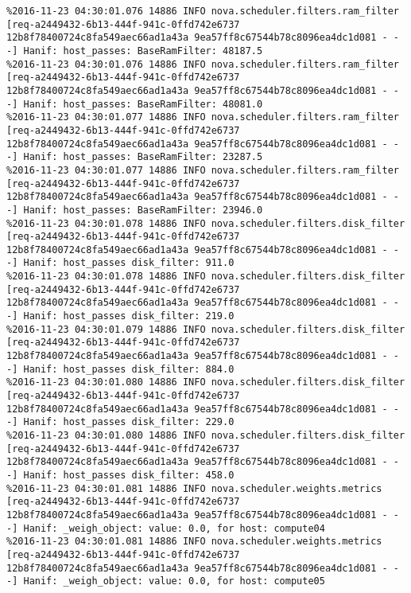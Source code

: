 \begin{lstlisting}[frame=single, caption={The filter scheduler log trace for 10 virtual instances}, label={lst:filterschedulercodetracelog10vi}, escapechar=|]
%2016-11-23 04:30:01.075 14886 INFO nova.scheduler.filters.ram_filter [req-a2449432-6b13-444f-941c-0ffd742e6737 12b8f78400724c8fa549aec66ad1a43a 9ea57ff8c67544b78c8096ea4dc1d081 - - -] Hanif: host_passes: BaseRamFilter: 11598.0
%2016-11-23 04:30:01.076 14886 INFO nova.scheduler.filters.ram_filter [req-a2449432-6b13-444f-941c-0ffd742e6737 12b8f78400724c8fa549aec66ad1a43a 9ea57ff8c67544b78c8096ea4dc1d081 - - -] Hanif: host_passes: BaseRamFilter: 48187.5
%2016-11-23 04:30:01.076 14886 INFO nova.scheduler.filters.ram_filter [req-a2449432-6b13-444f-941c-0ffd742e6737 12b8f78400724c8fa549aec66ad1a43a 9ea57ff8c67544b78c8096ea4dc1d081 - - -] Hanif: host_passes: BaseRamFilter: 48081.0
%2016-11-23 04:30:01.077 14886 INFO nova.scheduler.filters.ram_filter [req-a2449432-6b13-444f-941c-0ffd742e6737 12b8f78400724c8fa549aec66ad1a43a 9ea57ff8c67544b78c8096ea4dc1d081 - - -] Hanif: host_passes: BaseRamFilter: 23287.5
%2016-11-23 04:30:01.077 14886 INFO nova.scheduler.filters.ram_filter [req-a2449432-6b13-444f-941c-0ffd742e6737 12b8f78400724c8fa549aec66ad1a43a 9ea57ff8c67544b78c8096ea4dc1d081 - - -] Hanif: host_passes: BaseRamFilter: 23946.0
%2016-11-23 04:30:01.078 14886 INFO nova.scheduler.filters.disk_filter [req-a2449432-6b13-444f-941c-0ffd742e6737 12b8f78400724c8fa549aec66ad1a43a 9ea57ff8c67544b78c8096ea4dc1d081 - - -] Hanif: host_passes disk_filter: 911.0
%2016-11-23 04:30:01.078 14886 INFO nova.scheduler.filters.disk_filter [req-a2449432-6b13-444f-941c-0ffd742e6737 12b8f78400724c8fa549aec66ad1a43a 9ea57ff8c67544b78c8096ea4dc1d081 - - -] Hanif: host_passes disk_filter: 219.0
%2016-11-23 04:30:01.079 14886 INFO nova.scheduler.filters.disk_filter [req-a2449432-6b13-444f-941c-0ffd742e6737 12b8f78400724c8fa549aec66ad1a43a 9ea57ff8c67544b78c8096ea4dc1d081 - - -] Hanif: host_passes disk_filter: 884.0
%2016-11-23 04:30:01.080 14886 INFO nova.scheduler.filters.disk_filter [req-a2449432-6b13-444f-941c-0ffd742e6737 12b8f78400724c8fa549aec66ad1a43a 9ea57ff8c67544b78c8096ea4dc1d081 - - -] Hanif: host_passes disk_filter: 229.0
%2016-11-23 04:30:01.080 14886 INFO nova.scheduler.filters.disk_filter [req-a2449432-6b13-444f-941c-0ffd742e6737 12b8f78400724c8fa549aec66ad1a43a 9ea57ff8c67544b78c8096ea4dc1d081 - - -] Hanif: host_passes disk_filter: 458.0
%2016-11-23 04:30:01.081 14886 INFO nova.scheduler.weights.metrics [req-a2449432-6b13-444f-941c-0ffd742e6737 12b8f78400724c8fa549aec66ad1a43a 9ea57ff8c67544b78c8096ea4dc1d081 - - -] Hanif: _weigh_object: value: 0.0, for host: compute04
%2016-11-23 04:30:01.081 14886 INFO nova.scheduler.weights.metrics [req-a2449432-6b13-444f-941c-0ffd742e6737 12b8f78400724c8fa549aec66ad1a43a 9ea57ff8c67544b78c8096ea4dc1d081 - - -] Hanif: _weigh_object: value: 0.0, for host: compute05

\end{lstlisting}
